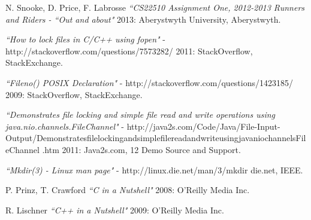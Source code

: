 \documentclass[a4paper, 10pt]{article}
\begin{document}
\begin{thebibliography}{1}

   N. Snooke, D. Price, F. Labrosse {\em ``CS22510 Assignment One, 2012-2013 Runners and Riders - ``Out and about"} 2013: Aberystwyth University, Aberystwyth.
 
  {\em ``How to lock files in C/C++ using fopen"}  - http://stackoverflow.com/questions/7573282/ 2011: StackOverflow, StackExchange.
 
   {\em ``Fileno() POSIX Declaration"}  - http://stackoverflow.com/questions/1423185/ 2009: StackOverflow, StackExchange.
 
   {\em ``Demonstrates file locking and simple file read and write operations using java.nio.channels.FileChannel"}  - http://java2s.com/Code/Java/File-Input-Output/DemonstratesfilelockingandsimplefilereadandwriteusingjavaniochannelsFileChannel .htm 2011: Java2s.com, 12 Demo Source and Support.
  
   {\em ``Mkdir(3) - Linux man page"}  - http://linux.die.net/man/3/mkdir die.net, IEEE.
 
   P. Prinz, T. Crawford {\em ``C in a Nutshell"} 2008: O'Reilly Media Inc.
  
   R. Lischner {\em ``C++ in a Nutshell"} 2009: O'Reilly Media Inc.
  
\end{thebibliography}
\end{document}
